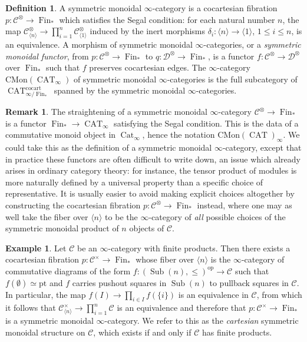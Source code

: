 \documentclass{article}
\theoremstyle{definition}
\newtheorem{definition}{Definition}[subsection]
\newtheorem{example}{Example}[subsection]
\newtheorem{remark}{Remark}[subsection]
\newcommand{\C}{\mathcal{C}}
\newcommand{\D}{\mathcal{D}}
\renewcommand{\i}{\infty}
\newcommand{\op}{\mathrm{op}}
\newcommand{\n}{\langle n\rangle}
\DeclareMathOperator{\Sub}{Sub}
\DeclareMathOperator{\cocart}{cocart}
\DeclareMathOperator{\Cat}{Cat}
\DeclareMathOperator{\CAT}{CAT}
\DeclareMathOperator{\Fin}{Fin}
\newcommand{\pt}{\mathrm{pt}}
\newcommand{\CMon}{\mathrm{CMon}}
\begin{document}
\begin{definition}
A symmetric monoidal $\infty$-category
is a cocartesian fibration $p:\C^\otimes\to\Fin_*$ which satisfies the Segal condition: for each natural number $n$, the map $\C^\otimes_{\n}\to\prod_{i=1}^n\C^\otimes_{\langle 1\rangle}$ induced by the inert morphisms $\delta_i:\n\to\langle 1\rangle$, $1\leq i\leq n$, is an equivalence.
A morphism of symmetric monoidal $\i$-categories, or a {\em symmetric monoidal functor}, from $p:\C^\otimes\to\Fin_*$ to $q:\D^\otimes\to\Fin_*$, is a functor $f:\C^\otimes\to\D^\otimes$ over $\Fin_*$ such that $f$ preserves cocartesian edges.
The $\i$-category $\CMon(\CAT_\i)$\index{$\CMon(\CAT_\i)$} of symmetric monoidal $\i$-categories is the full subcategory of $\CAT_{\i/\Fin_*}^{\cocart}$ spanned by the symmetric monoidal $\i$-categories.
\end{definition}
\begin{remark}
The straightening of a symmetric monoidal $\i$-category $\C^\otimes\to\Fin_*$ is a functor $\Fin_*\to\CAT_\i$ satisfying the Segal condition.
This is the data of a commutative monoid object in $\Cat_\i$, hence the notation $\CMon(\CAT)_\i$.
We could take this as the definition of a symmetric monoidal $\infty$-category, except that in practice these functors are often difficult to write down,
an issue which already arises in ordinary category theory: for instance, the tensor product of modules is more naturally defined by a universal property than a specific choice of representative.
It is usually easier to avoid making explicit choices altogether by constructing the cocartesian fibration $p:\C^\otimes\to\Fin_*$ instead, where one may as well take the fiber over $\langle n\rangle$ to be the $\infty$-category of {\em all} possible choices of the symmetric monoidal product of $n$ objects of $\C$.
\end{remark}
\begin{example}
Let $\C$ be an $\infty$-category with finite products.
Then there exists a cocartesian fibration $p:\C^\times\to\Fin_*$ whose fiber over $\n$ is the $\infty$-category of commutative diagrams of the form $f:(\Sub(n),\leq)^{\op}\to\C$ such that $f(\emptyset)\simeq\pt$ and $f$ carries pushout squares in $\Sub(n)$ to pullback squares in $\C$.
In particular, the map $f(I)\to\prod_{i\in I} f(\{i\})$ is an equivalence in $\C$, from which it follows that $\C^\times_{\n}\to\prod_{i=1}^n\C$ is an equivalence and therefore that $p:\C^\times\to\Fin_*$ is a symmetric monoidal $\infty$-category.
We refer to this as the {\em cartesian} symmetric monoidal structure
on $\C$, which exists if and only if $\C$ has finite products.
\end{example}
\end{document}
